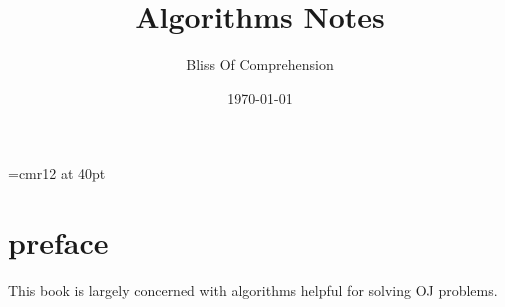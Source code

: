 \documentclass[a4paper,12pt]{report}
\begin{document}
\font\TitleF=cmr12 at 40pt
\title{\TitleF Algorithms Notes}
\author{Bliss Of Comprehension}
\date{\today}
\maketitle

\tableofcontents

\chapter*{preface}

This book is largely concerned with algorithms helpful for solving OJ problems. 


\end{document}
